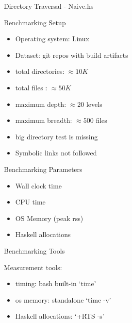 \documentclass[17pt]{beamer}
\begin{document}
\begin{frame}[fragile]{Directory Traversal - Naive.hs}
{}
\tiny
\begin{minipage}{\textwidth}
\end{minipage}
\end{frame}

\begin{frame}{Benchmarking Setup}{}
\begin{itemize}
  \item Operating system: Linux
  \item Dataset: git repos with build artifacts
  \item total directories: $\approx 10K$
  \item total files : $\approx 50K$
  \item maximum depth: $$ levels
  \item maximum breadth: $$ files
  \item big directory test is missing
  \item Symbolic links not followed
\end{itemize}
\end{frame}

\begin{frame}{Benchmarking Parameters}{}

\begin{itemize}
  \item Wall clock time
  \item CPU time
  \item OS Memory (peak rss)
  \item Haskell allocations
\end{itemize}
\end{frame}

\begin{frame}{Benchmarking Tools}{}

Measurement tools:
\begin{itemize}
  \item timing: bash built-in `time'
  \item os memory: standalone `time -v'
  \item Haskell allocations: `+RTS -s'
\end{itemize}
\end{frame}
\end{document}
